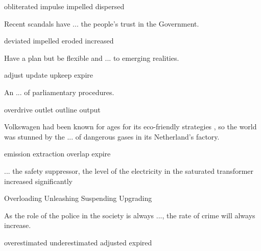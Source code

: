\documentclass{exam}
\begin{document}
\begin{questions}
\begin{oneparchoices}
 \choice obliterated
 \choice impulse
\correctchoice impelled
 \choice dispersed
\end{oneparchoices}


\question Recent scandals have ... the people's trust in the Government.\\
\begin{oneparchoices}
 \choice deviated
 \choice impelled
 \correctchoice  eroded
 \choice increased
\end{oneparchoices}
\question Have a plan but be flexible and ... to emerging realities.\\
\begin{oneparchoices}
\correctchoice adjust
\choice update
\choice upkeep
\choice expire
\end{oneparchoices}
\question An ... of parliamentary procedures.\\
\begin{oneparchoices}
\choice overdrive
\choice outlet
\correctchoice outline
\choice output
\end{oneparchoices}
\question  Volkswagen had been known for ages for its eco-friendly strategies , so the world was stunned by the ... of dangerous gases in its Netherland's factory.\\
\begin{oneparchoices}
\correctchoice emission
\choice extraction
\choice overlap
\choice expire
\end{oneparchoices}

\question ... the safety suppressor, the level of the electricity in the saturated transformer increased significantly\\
\begin{oneparchoices}
\choice Overloading
 \correctchoice Unleashing
 \choice Suspending
 \choice Upgrading
\end{oneparchoices}


\question As the role of the police in the society is always ..., the rate of crime will always increase.\\
\begin{oneparchoices}
\choice overestimated
 \correctchoice underestimated
 \choice adjusted
 \choice expired 
\end{oneparchoices}


\end{questions}
\end{document}
